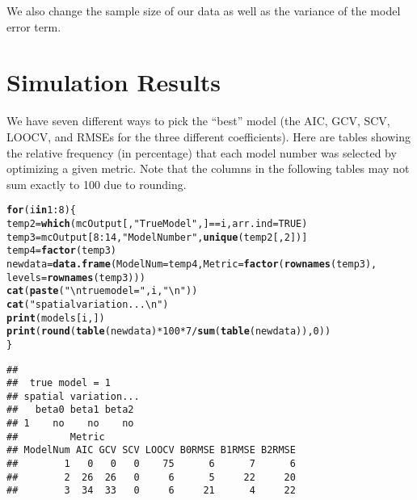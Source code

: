\documentclass{article}\usepackage[]{graphicx}\usepackage[]{color}
\makeatletter
\newcommand{\hlnum}[1]{\textcolor[rgb]{0.686,0.059,0.569}{#1}}%
\newcommand{\hlstr}[1]{\textcolor[rgb]{0.192,0.494,0.8}{#1}}%
\newcommand{\hlopt}[1]{\textcolor[rgb]{0,0,0}{#1}}%
\newcommand{\hlstd}[1]{\textcolor[rgb]{0.345,0.345,0.345}{#1}}%
\newcommand{\hlkwa}[1]{\textcolor[rgb]{0.161,0.373,0.58}{\textbf{#1}}}%
\newcommand{\hlkwb}[1]{\textcolor[rgb]{0.69,0.353,0.396}{#1}}%
\newcommand{\hlkwc}[1]{\textcolor[rgb]{0.333,0.667,0.333}{#1}}%
\newcommand{\hlkwd}[1]{\textcolor[rgb]{0.737,0.353,0.396}{\textbf{#1}}}%
\newenvironment{kframe}{%
 \def\at@end@of@kframe{}%
 \ifinner\ifhmode%
  \def\at@end@of@kframe{\end{minipage}}%
  \begin{minipage}{\columnwidth}%
 \fi\fi%
 \def\FrameCommand##1{\hskip\@totalleftmargin \hskip-\fboxsep
 \colorbox{shadecolor}{##1}\hskip-\fboxsep
     \hskip-\linewidth \hskip-\@totalleftmargin \hskip\columnwidth}%
 \MakeFramed {\advance\hsize-\width
   \@totalleftmargin\z@ \linewidth\hsize
   \@setminipage}}%
 {\par\unskip\endMakeFramed%
 \at@end@of@kframe}
\newenvironment{knitrout}{}{} %
\makeatother
\begin{document}
We also change the sample size of our data as well as the variance of the model error term.

\section{Simulation Results}

We have seven different ways to pick the ``best'' model (the AIC, GCV, SCV, LOOCV, and RMSEs for the three different coefficients). Here are tables showing the relative frequency (in percentage) that each model number was selected by optimizing a given metric. Note that the columns in the following tables may not sum exactly to 100 due to rounding.




\begin{knitrout}
\color{fgcolor}\begin{kframe}
\begin{alltt}
\hlkwa{for} \hlstd{(i} \hlkwa{in} \hlnum{1}\hlopt{:}\hlnum{8}\hlstd{) \{}
    \hlstd{temp2} \hlkwb{=} \hlkwd{which}\hlstd{(mcOutput[,} \hlstr{"True Model"}\hlstd{, ]} \hlopt{==} \hlstd{i,} \hlkwc{arr.ind} \hlstd{=} \hlnum{TRUE}\hlstd{)}
    \hlstd{temp3} \hlkwb{=} \hlstd{mcOutput[}\hlnum{8}\hlopt{:}\hlnum{14}\hlstd{,} \hlstr{"Model Number"}\hlstd{,} \hlkwd{unique}\hlstd{(temp2[,} \hlnum{2}\hlstd{])]}
    \hlstd{temp4} \hlkwb{=} \hlkwd{factor}\hlstd{(temp3)}
    \hlstd{newdata} \hlkwb{=} \hlkwd{data.frame}\hlstd{(}\hlkwc{ModelNum} \hlstd{= temp4,} \hlkwc{Metric} \hlstd{=} \hlkwd{factor}\hlstd{(}\hlkwd{rownames}\hlstd{(temp3),}
        \hlkwc{levels} \hlstd{=} \hlkwd{rownames}\hlstd{(temp3)))}
    \hlkwd{cat}\hlstd{(}\hlkwd{paste}\hlstd{(}\hlstr{"\textbackslash{}n true model ="}\hlstd{, i,} \hlstr{"\textbackslash{}n"}\hlstd{))}
    \hlkwd{cat}\hlstd{(}\hlstr{"spatial variation...\textbackslash{}n"}\hlstd{)}
    \hlkwd{print}\hlstd{(models[i, ])}
    \hlkwd{print}\hlstd{(}\hlkwd{round}\hlstd{(}\hlkwd{table}\hlstd{(newdata)} \hlopt{*} \hlnum{100} \hlopt{*} \hlnum{7}\hlopt{/}\hlkwd{sum}\hlstd{(}\hlkwd{table}\hlstd{(newdata)),} \hlnum{0}\hlstd{))}
\hlstd{\}}
\end{alltt}
\begin{verbatim}
## 
##  true model = 1 
## spatial variation...
##   beta0 beta1 beta2
## 1    no    no    no
##         Metric
## ModelNum AIC GCV SCV LOOCV B0RMSE B1RMSE B2RMSE
##        1   0   0   0    75      6      7      6
##        2  26  26   0     6      5     22     20
##        3  34  33   0     6     21      4     22

\end{verbatim}
\end{kframe}
\end{knitrout}
\end{document}
